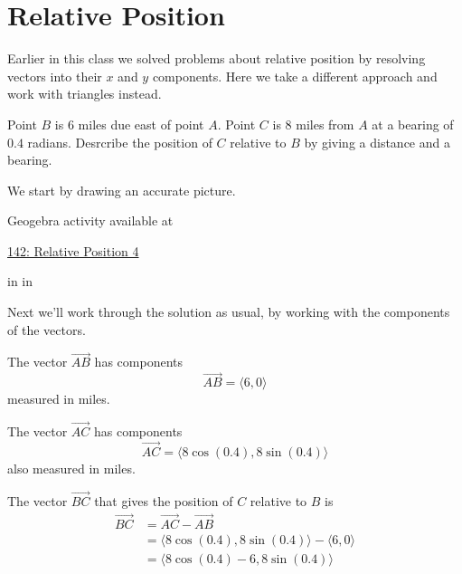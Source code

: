\documentclass{ximera}
\newcommand{\pskip}{\vskip 0.1 in}
\begin{document}
\section{Relative Position}
Earlier in this class we solved problems about relative position by resolving vectors into their $x$ and $y$ components. Here we take a different approach and work with triangles instead.

 \begin{example}  \label{Exergt43tgr}
Point $B$ is $6$ miles due east of point $A$. Point $C$ is $8$ miles from $A$ at a bearing of $0.4$ radians. Desrcribe the position of $C$ relative to $B$ by giving a distance and a bearing.

\begin{explanation}
We start by drawing an accurate picture.

 
\begin{onlineOnly}
    \begin{center}
\end{center}
\end{onlineOnly}


Geogebra activity available at

\href{https://www.geogebra.org/classic/kjnatcwc}{142: Relative Position 4}


\pskip \pskip

Next we'll work through the solution as usual, by working with the components of the vectors.

The vector $\overrightarrow{AB}$ has components
\[
   \overrightarrow{AB} = \langle 6, 0  \rangle
\]
measured in miles.

The vector $\overrightarrow{AC}$ has components
\[
    \overrightarrow{AC} = \langle 8 \cos (0.4), 8 \sin(0.4)  \rangle
\]
also measured in miles.

The vector $\overrightarrow{BC}$ that gives the position of $C$ relative to $B$ is
\begin{align*}
       \overrightarrow{BC} &= \overrightarrow{AC} - \overrightarrow{AB}    \\
                                    &= \langle 8 \cos (0.4), 8 \sin(0.4)  \rangle - \langle 6, 0  \rangle \\
                                    &= \langle 8 \cos (0.4) - 6, 8 \sin(0.4)  \rangle
\end{align*}


\end{explanation}
\end{example}
\end{document}
